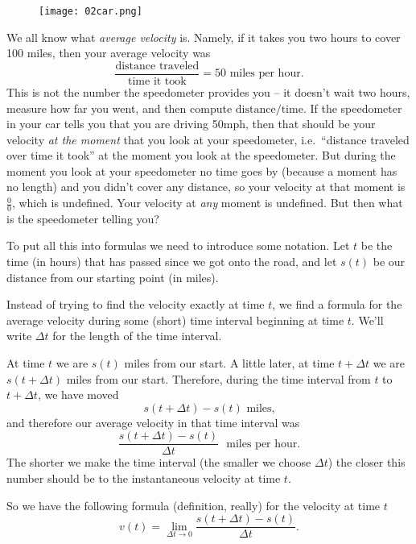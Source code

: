 \smallskip

\begin{figure}[h]
  \texttt{[image: 02car.png]}
\end{figure}

\smallskip

We all know what \emph{average velocity} is.  Namely, if it takes you two hours
to cover 100 miles, then your average velocity was
\[
\frac{\text{distance traveled}}{\text{time it took}} = 50 \text{ miles per
  hour}.
\]
This is not the number the speedometer provides you -- it doesn't wait two
hours, measure how far you went, and then compute
$\text{distance}/\text{time}$. If the speedometer in your car tells you that you
are driving 50mph, then that should be your velocity \emph{at the moment} that
you look at your speedometer, i.e.\ ``distance traveled over time it took'' at
the moment you look at the speedometer.  But during the moment you look at your
speedometer no time goes by (because a moment has no length) and you didn't
cover any distance, so your velocity at that moment is $\frac00$, which is
undefined.  Your velocity at \emph{any} moment is undefined.  But then what is
the speedometer telling you?

To put all this into formulas we need to introduce some notation.  Let $t$ be
the time (in hours) that has passed since we got onto the road, and let $s(t)$
be our distance from our starting point (in miles).

Instead of trying to find the velocity exactly at time $t$, we find a formula
for the average velocity during some (short) time interval beginning at time
$t$.  We'll write $\Delta t$ for the length of the time interval.

At time $t$ we are $s(t)$ miles from our start.  A little later, at time
$t+\Delta t$ we are $s(t+\Delta t)$ miles from our start.  Therefore, during the
time interval from $t$ to $t+\Delta t$, we have moved
\[
s(t+\Delta t) - s(t)\text{ miles,}
\]
and therefore our average velocity in that time interval was
\[
\frac{s(t+\Delta t) - s(t)}{\Delta t} \text{~ miles per hour.}
\]
The shorter we make the time interval (the smaller we choose $\Delta t$) the
closer this number should be to the instantaneous velocity at time $t$.

So we have the following formula (definition, really) for the velocity at time
$t$
\begin{equation}
  v(t) = \lim_{\Delta t\to0} \frac{s(t+\Delta t)- s(t)}{\Delta t}.
\end{equation}

